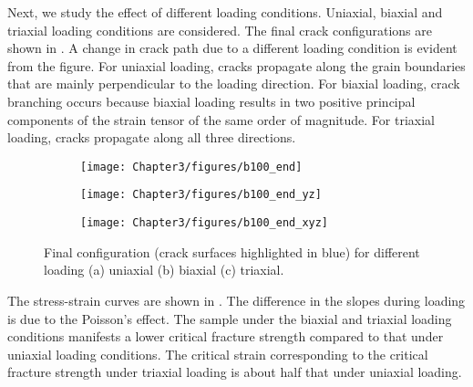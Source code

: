 Next, we study the effect of different loading conditions. Uniaxial, biaxial and triaxial loading conditions are considered. The final crack configurations are shown in . A change in crack path due to a different loading condition is evident from the figure. For uniaxial loading, cracks propagate along the grain boundaries that are mainly perpendicular to the loading direction. For biaxial loading, crack branching occurs because biaxial loading results in two positive principal components of the strain tensor of the same order of magnitude. For triaxial loading, cracks propagate along all three directions.
\begin{figure}[!htbp]
  \centering
  \begin{subfigure}{0.32\textwidth}
    \centering
    \texttt{[image: Chapter3/figures/b100\_end]}
    \caption{}
    \label{b100_load1}
  \end{subfigure}
  \begin{subfigure}{0.32\textwidth}
    \centering
    \texttt{[image: Chapter3/figures/b100\_end\_yz]}
    \caption{}
    \label{b100_load2}
  \end{subfigure}
  \begin{subfigure}{0.32\textwidth}
    \centering
    \texttt{[image: Chapter3/figures/b100\_end\_xyz]}
    \caption{}
    \label{b100_load3}
  \end{subfigure}
  \caption{ Final configuration (crack surfaces highlighted in blue) for different loading (a) uniaxial (b) biaxial (c) triaxial.}
  \label{final_loading}
\end{figure}

The stress-strain curves are shown in . The difference in the slopes during loading is due to the Poisson's effect. The sample under the biaxial and triaxial loading conditions manifests a lower critical fracture strength compared to that under uniaxial loading conditions. The critical strain corresponding to the critical fracture strength under triaxial loading is about half that under uniaxial loading.

